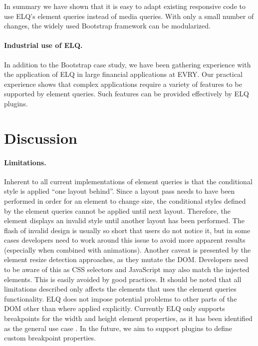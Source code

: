 \documentclass{llncs}
\newcommand{\elq}{ELQ}
\begin{document}
    In summary we have shown that it is easy to adapt existing responsive code to use \elq{}'s element queries instead of media queries.
    With only a small number of changes, the widely used Bootstrap framework can be modularized.

    \paragraph{Industrial use of \elq{}.}
    In addition to the Bootstrap case study, we have been gathering experience with the application of \elq{} in large financial applications at EVRY.
    Our practical experience shows that complex applications require a variety of features to be supported by element queries.
    Such features can be provided effectively by \elq{} plugins.

\section{Discussion}\label{sec:discussion}
  \paragraph{Limitations.}
    Inherent to all current implementations of element queries is that the conditional style is applied ``one layout behind''.
    Since a layout pass needs to have been performed in order for an element to change size, the conditional styles defined by the element queries cannot be applied until next layout.
    Therefore, the element displays an invalid style until another layout has been performed.
    The flash of invalid design is usually so short that users do not notice it, but in some cases developers need to work around this issue to avoid more apparent results (especially when combined with animations).
    Another caveat is presented by the element resize detection approaches, as they mutate the DOM.
    Developers need to be aware of this as CSS selectors and JavaScript may also match the injected elements.
    This is easily avoided by good practices.
    It should be noted that all limitations described only affects the elements that uses the element queries functionality.
    \elq{} does not impose potential problems to other parts of the DOM other than where applied explicitly.
    Currently \elq{} only supports breakpoints for the width and height element properties, as it has been identified as the general use case \cite{elq-thesis}.
    In the future, we aim to support plugins to define custom breakpoint properties.
\end{document}
